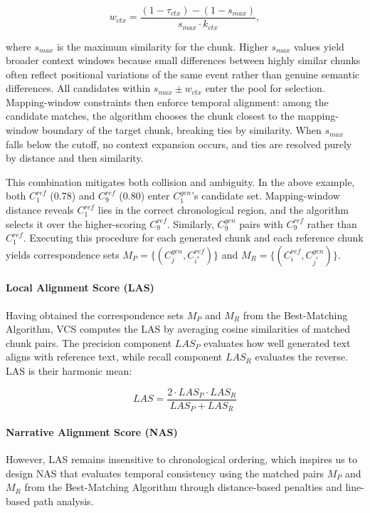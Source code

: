 \documentclass[letterpaper]{article} %
\begin{document}
\begin{equation}
w_{ctx} = \frac{(1-\tau_{ctx})-(1-s_{max})}{s_{max} \cdot k_{ctx}},
\end{equation}

where $s_{max}$ is the maximum similarity for the chunk. Higher $s_{max}$ values yield broader context windows because small differences between highly similar chunks often reflect positional variations of the same event rather than genuine semantic differences. All candidates within $s_{max} \pm w_{ctx}$ enter the pool for selection. Mapping-window constraints then enforce temporal alignment: among the candidate matches, the algorithm chooses the chunk closest to the mapping-window boundary of the target chunk, breaking ties by similarity. When $s_{max}$ falls below the cutoff, no context expansion occurs, and ties are resolved purely by distance and then similarity.

This combination mitigates both collision and ambiguity. In the above example, both $C_1^{ref}$ (0.78) and $C_9^{ref}$ (0.80) enter $C_1^{gen}$'s candidate set. Mapping-window distance reveals $C_1^{ref}$ lies in the correct chronological region, and the algorithm selects it over the higher-scoring $C_9^{ref}$. Similarly, $C_9^{gen}$ pairs with $C_9^{ref}$ rather than $C_1^{ref}$. Executing this procedure for each generated chunk and each reference chunk yields correspondence sets $M_P = \{(C_j^{gen}, C_{i^*}^{ref})\}$ and $M_R = \{(C_i^{ref}, C_{j^*}^{gen})\}$.

\paragraph{Local Alignment Score (LAS)}
Having obtained the correspondence sets $M_P$ and $M_R$ from the Best-Matching Algorithm, VCS computes the LAS by averaging cosine similarities of matched chunk pairs. The precision component $LAS_P$ evaluates how well generated text aligns with reference text, while recall component $LAS_R$ evaluates the reverse. LAS is their harmonic mean:

\begin{equation}
LAS = \frac{2 \cdot LAS_P \cdot LAS_R}{LAS_P + LAS_R}
\end{equation}

\paragraph{Narrative Alignment Score (NAS)}
However, LAS remains insensitive to chronological ordering, which inspires us to design NAS that evaluates temporal consistency using the matched pairs $M_P$ and $M_R$ from the Best-Matching Algorithm through distance-based penalties and line-based path analysis.
\end{document}
